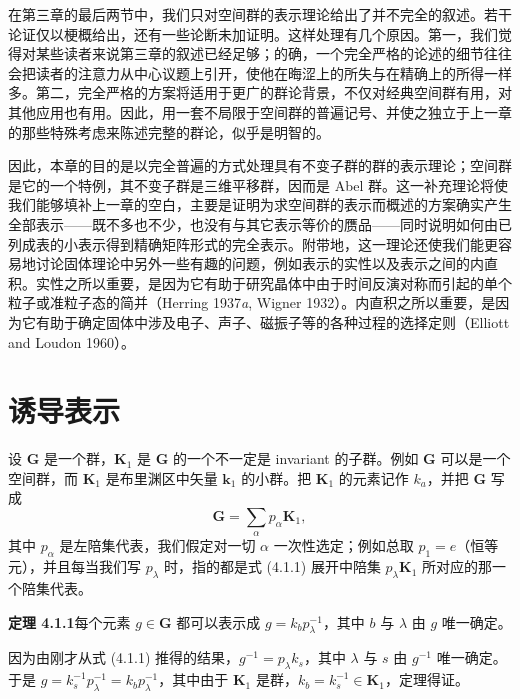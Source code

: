 
在第三章的最后两节中，我们只对空间群的表示理论给出了并不完全的叙述。若干论证仅以梗概给出，还有一些论断未加证明。这样处理有几个原因。第一，我们觉得对某些读者来说第三章的叙述已经足够；的确，一个完全严格的论述的细节往往会把读者的注意力从中心议题上引开，使他在晦涩上的所失与在精确上的所得一样多。第二，完全严格的方案将适用于更广的群论背景，不仅对经典空间群有用，对其他应用也有用。因此，用一套不局限于空间群的普遍记号、并使之独立于上一章的那些特殊考虑来陈述完整的群论，似乎是明智的。

因此，本章的目的是以完全普遍的方式处理具有不变子群的群的表示理论；空间群是它的一个特例，其不变子群是三维平移群，因而是 Abel 群。这一补充理论将使我们能够填补上一章的空白，主要是证明为求空间群的表示而概述的方案确实产生全部表示——既不多也不少，也没有与其它表示等价的赝品——同时说明如何由已列成表的小表示得到精确矩阵形式的完全表示。附带地，这一理论还使我们能更容易地讨论固体理论中另外一些有趣的问题，例如表示的实性以及表示之间的内直积。实性之所以重要，是因为它有助于研究晶体中由于时间反演对称而引起的单个粒子或准粒子态的简并（Herring 1937\textit{a}, Wigner 1932）。内直积之所以重要，是因为它有助于确定固体中涉及电子、声子、磁振子等的各种过程的选择定则（Elliott and Loudon 1960）。

\section{诱导表示}

设 $\mathbf{G}$ 是一个群，$\mathbf{K}_{1}$ 是 $\mathbf{G}$ 的一个不一定是 invariant 的子群。例如 $\mathbf{G}$ 可以是一个空间群，而 $\mathbf{K}_{1}$ 是布里渊区中矢量 $\mathbf{k}_{1}$ 的小群。把 $\mathbf{K}_{1}$ 的元素记作 $k_{a}$，并把 $\mathbf{G}$ 写成
\begin{equation*}
\mathbf{G} = \sum_{\alpha}p_{\alpha}\mathbf{K}_{1},
\tag{4.1.1}
\end{equation*}
其中 $p_{\alpha}$ 是左陪集代表，我们假定对一切 $\alpha$ 一次性选定；例如总取 $p_{1} = e$（恒等元），并且每当我们写 $p_{\lambda}$ 时，指的都是式 (4.1.1) 展开中陪集 $p_{\lambda}\mathbf{K}_{1}$ 所对应的那一个陪集代表。

\noindent\textbf{定理 4.1.1}\quad 每个元素 $g \in \mathbf{G}$ 都可以表示成 $g = k_{b}p^{-1}_{\lambda}$，其中 $b$ 与 $\lambda$ 由 $g$ 唯一确定。

因为由刚才从式 (4.1.1) 推得的结果，$g^{-1} = p_{\lambda}k_{s}$，其中 $\lambda$ 与 $s$ 由 $g^{-1}$ 唯一确定。于是 $g = k^{-1}_{s}p^{-1}_{\lambda} = k_{b}p^{-1}_{\lambda}$，其中由于 $\mathbf{K}_{1}$ 是群，$k_{b} = k^{-1}_{s} \in \mathbf{K}_{1}$，定理得证。

